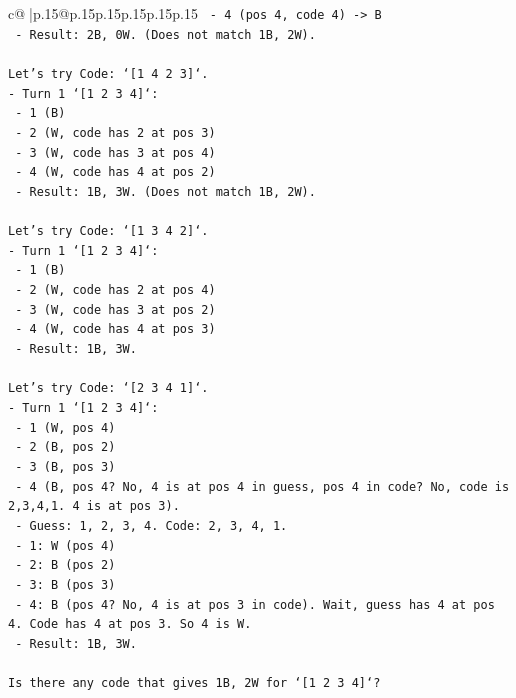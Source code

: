 \documentclass{article}
\begin{document}
{\begin{supertabular}{c@{$\;$}|p{.15\linewidth}@{}p{.15\linewidth}p{.15\linewidth}p{.15\linewidth}p{.15\linewidth}p{.15\linewidth}}
{{{\texttt{  {-} 4 (pos 4, code 4) {-}> B} \\
\texttt{  {-} Result: 2B, 0W. (Does not match 1B, 2W).} \\
\\ 
\texttt{Let's try Code: `{[}1 4 2 3{]}`.} \\
\texttt{{-} Turn 1 `{[}1 2 3 4{]}`:} \\
\texttt{  {-} 1 (B)} \\
\texttt{  {-} 2 (W, code has 2 at pos 3)} \\
\texttt{  {-} 3 (W, code has 3 at pos 4)} \\
\texttt{  {-} 4 (W, code has 4 at pos 2)} \\
\texttt{  {-} Result: 1B, 3W. (Does not match 1B, 2W).} \\
\\ 
\texttt{Let's try Code: `{[}1 3 4 2{]}`.} \\
\texttt{{-} Turn 1 `{[}1 2 3 4{]}`:} \\
\texttt{  {-} 1 (B)} \\
\texttt{  {-} 2 (W, code has 2 at pos 4)} \\
\texttt{  {-} 3 (W, code has 3 at pos 2)} \\
\texttt{  {-} 4 (W, code has 4 at pos 3)} \\
\texttt{  {-} Result: 1B, 3W.} \\
\\ 
\texttt{Let's try Code: `{[}2 3 4 1{]}`.} \\
\texttt{{-} Turn 1 `{[}1 2 3 4{]}`:} \\
\texttt{  {-} 1 (W, pos 4)} \\
\texttt{  {-} 2 (B, pos 2)} \\
\texttt{  {-} 3 (B, pos 3)} \\
\texttt{  {-} 4 (B, pos 4? No, 4 is at pos 4 in guess, pos 4 in code? No, code is 2,3,4,1. 4 is at pos 3).} \\
\texttt{  {-} Guess: 1, 2, 3, 4. Code: 2, 3, 4, 1.} \\
\texttt{  {-} 1: W (pos 4)} \\
\texttt{  {-} 2: B (pos 2)} \\
\texttt{  {-} 3: B (pos 3)} \\
\texttt{  {-} 4: B (pos 4? No, 4 is at pos 3 in code). Wait, guess has 4 at pos 4. Code has 4 at pos 3. So 4 is W.} \\
\texttt{  {-} Result: 1B, 3W.} \\
\\ 
\texttt{Is there any code that gives 1B, 2W for `{[}1 2 3 4{]}`?} \\
}}}
\end{supertabular}}
\end{document}
